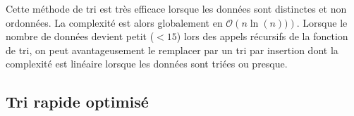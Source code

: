 \documentclass[10pt,fleqn]{article} %
\begin{document}
\begin{rem}
Cette méthode de tri est très efficace lorsque les données sont distinctes et non ordonnées. La complexité est alors globalement en $\mathcal{O}\left(n \ln(n))\right)$. Lorsque le nombre de données devient petit ($<15$) lors des appels récursifs de la fonction de tri, on peut avantageusement le remplacer par un tri par insertion dont la complexité est linéaire lorsque les données sont triées ou presque.
\end{rem}

\subsection{Tri rapide optimisé}


\begin{pseudo}
~\\


\end{pseudo}
\end{document}
